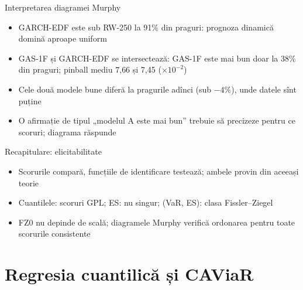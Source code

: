 \begin{frame}{Interpretarea diagramei Murphy}
\itemsize{\small}
\begin{itemize}
    \item GARCH-EDF este sub RW-250 la 91\% din praguri: prognoza dinamică domină aproape uniform
    \item GAS-1F și GARCH-EDF se intersectează: GAS-1F este mai bun doar la 38\% din praguri; pinball mediu 7{,}66 și 7{,}45 ($\times 10^{-2}$)
    \item Cele două modele bune diferă la pragurile adînci (sub $-4\%$), unde datele sînt puține
    \item O afirmație de tipul „modelul A este mai bun” trebuie să precizeze pentru ce scoruri; diagrama răspunde
\end{itemize}
\end{frame}

\begin{frame}{Recapitulare: elicitabilitate}
\itemsize{\small}
\begin{itemize}
    \item Scorurile compară, funcțiile de identificare testează; ambele provin din aceeași teorie
    \item Cuantilele: scoruri GPL; ES: nu singur; (VaR, ES): clasa Fissler--Ziegel
    \item FZ0 nu depinde de scală; diagramele Murphy verifică ordonarea pentru toate scorurile consistente
\end{itemize}
\end{frame}


\section{Regresia cuantilică și CAViaR}

